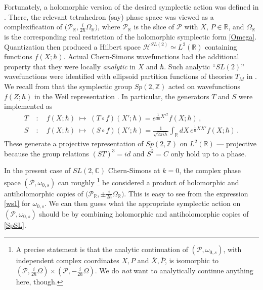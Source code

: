 \documentclass[11pt,letterpaper]{article}
\numberwithin{equation}{section}
\newcommand{\ol}{\overline}
\newcommand{\Z}{{\mathbb Z}}
\newcommand{\R}{{\mathbb R}}
\newcommand{\C}{{\mathbb C}}
\newcommand{\CH}{\mathcal{H}}
\newcommand{\CP}{\mathcal{P}}
\begin{document}
Fortunately, a holomorphic version of the desired symplectic action was  defined in \cite{Dimofte-QRS}. There, the relevant tetrahedron (say) phase space was viewed as a complexification of $\big(\CP_\R,\tfrac{i}{2\hbar}\Omega_\R\big)$, where $\CP_\R$ is the slice of $\CP$ with $X,\,P\in \R$, and $\Omega_\R$ is the corresponding real restriction of the holomorphic symplectic form \eqref{Omega}. Quantization then produced a Hilbert space $\CH^{SL(2)}\simeq L^2(\R)$ containing functions $f(X;\hbar)$. Actual Chern-Simons wavefunctions had the additional property that they were locally \emph{analytic} in $X$ and $\hbar$. Such analytic ``$SL(2)$'' wavefunctions were identified with ellipsoid partition functions of theories $T_M$ in \cite{Yamazaki-3d,DG-Sdual,DGG}.
%
We recall from \cite{Dimofte-QRS} that the symplectic group $Sp(2,\Z)$ acted on wavefunctions $f(Z;\hbar)$ in the Weil representation \cite{Shale-rep, Weil-rep}. In particular, the generators $T$ and $S$ were implemented as
%
\begin{subequations} \label{SpSL}
\begin{align} T\;&:\quad f(X;\hbar)\;\mapsto\; (T\circ f)(X';\hbar)= e^{\frac{1}{2\hbar}X'^2}f(X;\hbar)\,, \\
S\;&:\quad f(X;\hbar)\;\mapsto\; (S\circ f)(X';\hbar)= \frac{1}{\sqrt{2\pi i\hbar}}\int_\R dX\, e^{\frac{1}{\hbar}XX'} f(X;\hbar)\,.
\end{align}
\end{subequations}
%
These generate a projective representation of $Sp(2,\Z)$ on $L^2(\R)$ --- projective because the group relations $(ST)^3=id$ and $S^2=C$ only hold up to a phase.

In the present case of $SL(2,\C)$ Chern-Simons at $k=0$, the complex phase space $(\CP,\omega_{0,s})$ can roughly%
%
\footnote{A precise statement is that the analytic continuation of $(\CP,\omega_{0,s})$, with independent complex coordinates $X,P$ and $\ol X,\ol P$, is isomorphic to $(\CP,\tfrac{i}{2\hbar}\Omega)\times(\CP,-\tfrac{i}{2\hbar}\Omega)$. We do \emph{not} want to analytically continue anything here, though.} %
%
be considered a product of holomorphic and antiholomorphic copies of $\big(\CP_\R,\pm\tfrac{i}{2\hbar}\Omega_\R\big)$. This is easy to see from the expression \eqref{ws1} for $\omega_{0,s}$. We can then guess what the appropriate symplectic action on $(\CP,\omega_{0,s})$ should be by combining holomorphic and antiholomorphic copies of \eqref{SpSL}.
\end{document}
